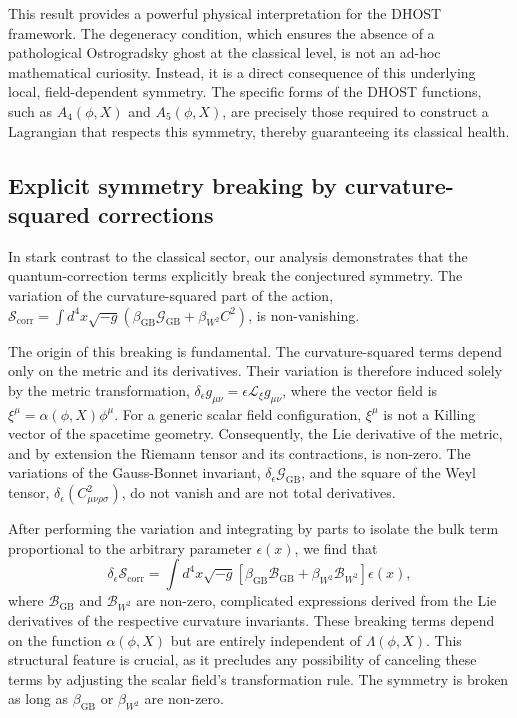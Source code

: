 \documentclass[twocolumn]{aastex631}
\begin{document}
This result provides a powerful physical interpretation for the DHOST framework. The degeneracy condition, which ensures the absence of a pathological Ostrogradsky ghost at the classical level, is not an ad-hoc mathematical curiosity. Instead, it is a direct consequence of this underlying local, field-dependent symmetry. The specific forms of the DHOST functions, such as $A_4(\phi, X)$ and $A_5(\phi, X)$, are precisely those required to construct a Lagrangian that respects this symmetry, thereby guaranteeing its classical health.

\subsection{Explicit symmetry breaking by curvature-squared corrections}

In stark contrast to the classical sector, our analysis demonstrates that the quantum-correction terms explicitly break the conjectured symmetry. The variation of the curvature-squared part of the action, $\mathcal{S}_{\text{corr}} = \int d^4x \sqrt{-g} (\beta_{\text{GB}} \mathcal{G}_{\text{GB}} + \beta_{W^2} C^2)$, is non-vanishing.

The origin of this breaking is fundamental. The curvature-squared terms depend only on the metric and its derivatives. Their variation is therefore induced solely by the metric transformation, $\delta_\epsilon g_{\mu\nu} = \epsilon \mathcal{L}_{\xi} g_{\mu\nu}$, where the vector field is $\xi^\mu = \alpha(\phi, X)\phi^\mu$. For a generic scalar field configuration, $\xi^\mu$ is not a Killing vector of the spacetime geometry. Consequently, the Lie derivative of the metric, and by extension the Riemann tensor and its contractions, is non-zero. The variations of the Gauss-Bonnet invariant, $\delta_\epsilon \mathcal{G}_{\text{GB}}$, and the square of the Weyl tensor, $\delta_\epsilon (C_{\mu\nu\rho\sigma}^2)$, do not vanish and are not total derivatives.

After performing the variation and integrating by parts to isolate the bulk term proportional to the arbitrary parameter $\epsilon(x)$, we find that
\begin{equation}
\delta_\epsilon \mathcal{S}_{\text{corr}} = \int d^4x \sqrt{-g} \left[ \beta_{\text{GB}} \mathcal{B}_{\text{GB}} + \beta_{W^2} \mathcal{B}_{W^2} \right] \epsilon(x),
\end{equation}
where $\mathcal{B}_{\text{GB}}$ and $\mathcal{B}_{W^2}$ are non-zero, complicated expressions derived from the Lie derivatives of the respective curvature invariants. These breaking terms depend on the function $\alpha(\phi, X)$ but are entirely independent of $\Lambda(\phi, X)$. This structural feature is crucial, as it precludes any possibility of canceling these terms by adjusting the scalar field's transformation rule. The symmetry is broken as long as $\beta_{\text{GB}}$ or $\beta_{W^2}$ are non-zero.
\end{document}
